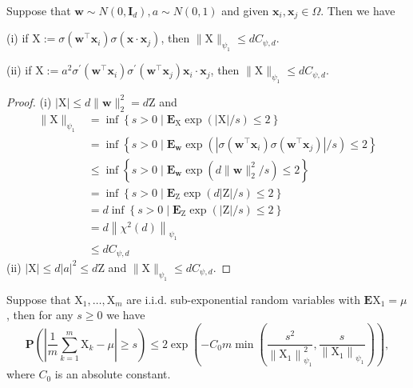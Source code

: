 \begin{lemma}\label{matrice sub}
    Suppose that $\boldsymbol{w} \sim N\left(0, \boldsymbol{I}_d\right), a \sim N(0,1)$ and given $\boldsymbol{x}_i, \boldsymbol{x}_j \in \Omega$. Then we have
    
(i) if $\mathrm{X}:=\sigma\left(\boldsymbol{w}^{\top} \boldsymbol{x}_i\right) \sigma\left(\boldsymbol{x} \cdot \boldsymbol{x}_j\right)$, then $\|\mathrm{X}\|_{\psi_1} \leq d C_{\psi, d}$.

(ii) if $\mathrm{X}:=a^2 \sigma^{\prime}\left(\boldsymbol{w}^{\top} \boldsymbol{x}_i\right) \sigma^{\prime}\left(\boldsymbol{w}^{\top} \boldsymbol{x}_j\right) \boldsymbol{x}_i \cdot \boldsymbol{x}_j$, then $\|\mathrm{X}\|_{\psi_1} \leq d C_{\psi, d}$.
\end{lemma}
\begin{proof}
(i) $|\mathrm{X}| \leq d\|\boldsymbol{w}\|_2^2=d \mathrm{Z}$ and
$$
\begin{aligned}
\|\mathrm{X}\|_{\psi_1} & =\inf \left\{s>0 \mid \mathbf{E}_{\mathrm{X}} \exp (|\mathrm{X}| / s) \leq 2\right\} \\
& =\inf \left\{s>0 \mid \mathbf{E}_{\boldsymbol{w}} \exp \left(\left|\sigma\left(\boldsymbol{w}^{\top} \boldsymbol{x}_i\right) \sigma\left(\boldsymbol{w}^{\top} \boldsymbol{x}_j\right)\right| / s\right) \leq 2\right\} \\
& \leq \inf \left\{s>0 \mid \mathbf{E}_{\boldsymbol{w}} \exp \left(d\|\boldsymbol{w}\|_2^2 / s\right) \leq 2\right\} \\
& =\inf \left\{s>0 \mid \mathbf{E}_{\mathrm{Z}} \exp (d|\mathrm{Z}| / s) \leq 2\right\} \\
& =d \inf \left\{s>0 \mid \mathbf{E}_{\mathrm{Z}} \exp (|\mathrm{Z}| / s) \leq 2\right\} \\
& =d\left\|\chi^2(d)\right\|_{\psi_1} \\
& \leq d C_{\psi, d}
\end{aligned}
$$
(ii) $|\mathrm{X}| \leq d|a|^2 \leq d \mathrm{Z}$ and $\|\mathrm{X}\|_{\psi_1} \leq d C_{\psi, d}$.
\end{proof}

\begin{proposition}\label{vershynin}
    Suppose that $\mathrm{X}_1, \ldots, \mathrm{X}_m$ are i.i.d. sub-exponential random variables with $\mathbf{E} \mathrm{X}_1=\mu$, then for any $s \geq 0$ we have
$$
\mathbf{P}\left(\left|\frac{1}{m} \sum_{k=1}^m \mathrm{X}_k-\mu\right| \geq s\right) \leq 2 \exp \left(-C_0 m \min \left(\frac{s^2}{\left\|\mathrm{X}_1\right\|_{\psi_1}^2}, \frac{s}{\left\|\mathrm{X}_1\right\|_{\psi_1}}\right)\right),
$$
where $C_0$ is an absolute constant.
\end{proposition}

